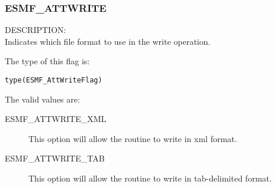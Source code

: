 \subsubsection{ESMF\_ATTWRITE}
\label{const:attwrite}

{\sf DESCRIPTION:\\}
Indicates which file format to use in the write operation.

The type of this flag is:

{\tt type(ESMF\_AttWriteFlag)}

The valid values are:
\begin{description}
	\item[ESMF\_ATTWRITE\_XML]
	This option will allow the routine to write in xml format.
	\item[ESMF\_ATTWRITE\_TAB]
	This option will allow the routine to write in tab-delimited format.
\end{description}

